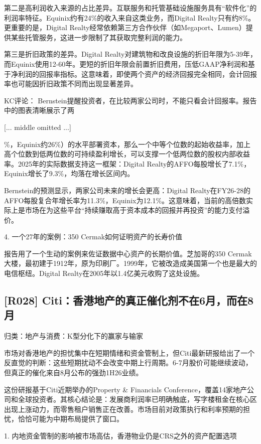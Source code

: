 \documentclass[11pt]{ctexart}
\begin{document}
第二是高利润收入来源的占比差异。互联服务和托管基础设施服务具有“软件化”的利润率特征。Equinix约有24\%的收入来自这类业务，而Digital Realty只有约8\%。更重要的是，Digital Realty经常依赖第三方合作伙伴（如Megaport、Lumen）提供某些托管服务，这进一步限制了其获取完整利润的能力。

第三是折旧政策的差异。Digital Realty对建筑物和改良设施的折旧年限为5-39年，而Equinix使用12-60年。更短的折旧年限会前置折旧费用，压低GAAP净利润和基于净利润的回报率指标。这意味着，即使两个资产的经济回报完全相同，会计回报率也可能因折旧政策不同而出现显著差异。

KC评论： Bernstein提醒投资者，在比较两家公司时，不能只看会计回报率。报告中的图表清晰展示了两

[... middle omitted ...]

\%，Equinix约26\%）的水平部署资本，那么一个中等个位数的起始收益率，加上高个位数到低两位数的可持续盈利增长，可以支撑一个低两位数的股权内部收益率。2025年的实际数据支持这一框架：Digital Realty的AFFO每股增长了7.1\%，Equinix增长了9.3\%，均落在增长区间内。

Bernstein的预测显示，两家公司未来的增长会更高：Digital Realty在FY26-28的AFFO每股复合年增长率为11.3\%，Equinix为12.1\%。这意味着，当前的高倍数实际上是市场在为这些平台“持续赚取高于资本成本的回报并再投资”的能力支付溢价。

4. 一个27年的案例：350 Cermak如何证明资产的长寿价值

报告用了一个生动的案例来佐证数据中心资产的长期价值。芝加哥的350 Cermak大楼，最初建于1912年，原为印刷厂。1999年，它被改造成美国第一个也是最大的电信枢纽。Digital Realty在2005年以1.4亿美元收购了这处设施。

\subsection{[R028] Citi：香港地产的真正催化剂不在6月，而在8月}
{\small\color{refgray}归类：地产与消费：K型分化下的赢家与输家}

市场对香港地产的担忧集中在短期情绪和资金管制上，但Citi最新研报给出了一个反直觉的判断：这些短期扰动不会改变中期上行周期。6-7月股价可能继续波动，但真正的催化来自8月公布的强劲1H26业绩。

这份研报基于Citi近期举办的Property \& Financials Conference，覆盖14家地产公司和全球投资者。其核心结论是：发展商利润率已明确触底，写字楼租金在核心区出现上涨动力，而零售租户销售正在改善。市场目前对政策执行和利率预期的担忧，恰恰可能为中期布局提供了窗口。

1. 内地资金管制的影响被市场高估，香港物业仍是CRS之外的资产配置选项
\end{document}
